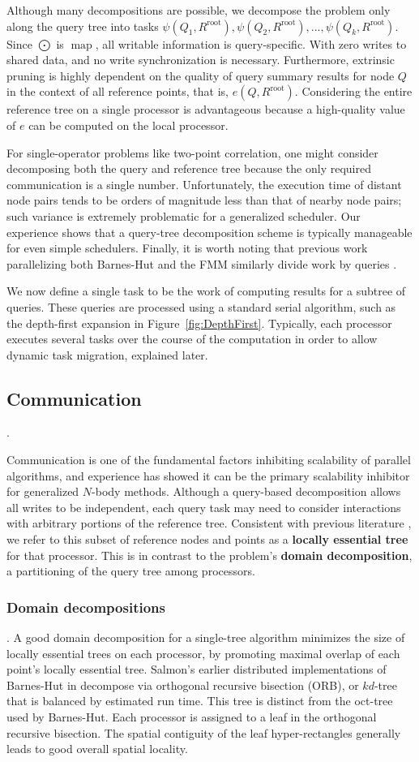 \documentclass[twoside,leqno,twocolumn]{article}
\DeclareMathOperator*{\map}{map}
\newcommand{\fig}[1]{Figure~\ref{fig:#1}}
\newcommand{\gnp}{\psi}
\newcommand{\mysubsub}[1]{\subsubsection{#1}. }
\newcommand{\mysub}[1]{\subsection{#1}. }
\newcommand{\defterm}[1]{{\bf #1}}
\newcommand{\kdroot}[1]{#1^{\text{root}}}
\newcommand{\lettermu}{e}
\newcommand{\inmu}{e}
\begin{document}
Although many decompositions are possible, we decompose the problem only along the query tree into tasks $\gnp(Q_1, \kdroot{R}), \gnp(Q_2, \kdroot{R}), ..., \gnp(Q_k, \kdroot{R})$.
Since $\bigodot$ is $\map$, all writable information is query-specific.
With zero writes to shared data, and no write synchronization is necessary.
Furthermore, extrinsic pruning is highly dependent on the quality of query summary results for node $Q$ in the context of all reference points, that is, $\inmu(Q, \kdroot{R})$.
Considering the entire reference tree on a single processor is advantageous because a high-quality value of $\lettermu$ can be computed on the local processor.

For single-operator problems like two-point correlation, one might consider decomposing both the query and reference tree because the only required communication is a single number.
Unfortunately, the execution time of distant node pairs tends to be orders of magnitude less than that of nearby node pairs; such variance is extremely problematic for a generalized scheduler.
Our experience shows that a query-tree decomposition scheme is typically manageable for even simple schedulers.
Finally, it is worth noting that previous work parallelizing both Barnes-Hut and the FMM similarly divide work by queries \cite{liu94experiences, salmon_thesis, singh_thesis}.

We now define a single task to be the work of computing results for a subtree of queries.
These queries are processed using a standard serial algorithm, such as the depth-first expansion in \fig{DepthFirst}.
Typically, each processor executes several tasks over the course of the computation in order to allow dynamic task migration, explained later.

\mysub{Communication}

Communication is one of the fundamental factors inhibiting scalability of parallel algorithms, and experience has showed it can be the primary scalability inhibitor for generalized $N$-body methods.
Although a query-based decomposition allows all writes to be independent, each query task may need to consider interactions with arbitrary portions of the reference tree.
Consistent with previous literature \cite{salmon_thesis, singh_thesis}, we refer to this subset of reference nodes and points as a \defterm{locally essential tree} for that processor.
This is in contrast to the problem's \defterm{domain decomposition}, a partitioning of the query tree among processors.

\mysubsub{Domain decompositions}
A good domain decomposition for a single-tree algorithm minimizes the size of locally essential trees on each processor, by promoting maximal overlap of each point's locally essential tree.
Salmon's earlier distributed implementations of Barnes-Hut in \cite{salmon_thesis} decompose via orthogonal recursive bisection (ORB), or $kd$-tree that is balanced by estimated run time.
This tree is distinct from the oct-tree used by Barnes-Hut.
Each processor is assigned to a leaf in the orthogonal recursive bisection.
The spatial contiguity of the leaf hyper-rectangles generally leads to good overall spatial locality.
\end{document}
